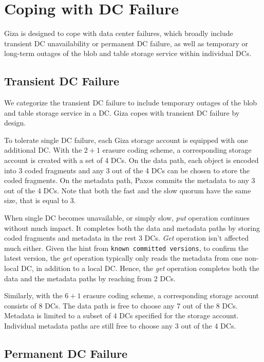 \section{Coping with DC Failure}


Giza is designed to cope with data center failures,
which broadly include transient DC unavailability or permanent DC failure,
as well as temporary or long-term outages of the blob and table storage service within individual DCs.

\subsection{Transient DC Failure}

We categorize the transient DC failure to include temporary outages of the blob and table storage service in a DC.
Giza copes with transient DC failure by design.

To tolerate single DC failure, each Giza storage account is equipped with one additional DC.
With the $2 + 1$ erasure coding scheme, a corresponding storage account is created with a set of 4 DCs.
On the data path, each object is encoded into 3 coded fragments and any 3 out of the 4 DCs can be chosen to store the coded fragments.
On the metadata path, Paxos commits the metadata to any 3 out of the 4 DCs. Note that both the fast and the slow quorum have the same size, that is equal to 3.

When single DC becomes unavailable, or simply slow, {\em put} operation continues without much impact. It completes both the data and metadata paths by storing coded fragments and metadata in the rest 3 DCs. {\em Get} operation isn't affected much either. Given the hint from {\tt known committed versions}, to confirm the latest version, the {\em get} operation typically only reads the metadata from one non-local DC, in addition to a local DC. Hence, the {\em get} operation completes both the data and the metadata paths by reaching from 2 DCs.

Similarly, with the $6 + 1$ erasure coding scheme, a corresponding storage account consists of 8 DCs. The data path is free to choose any 7 out of the 8 DCs. Metadata is limited to a subset of 4 DCs specified for the storage account. Individual metadata paths are still free to choose any 3 out of the 4 DCs.

\subsection{Permanent DC Failure}

